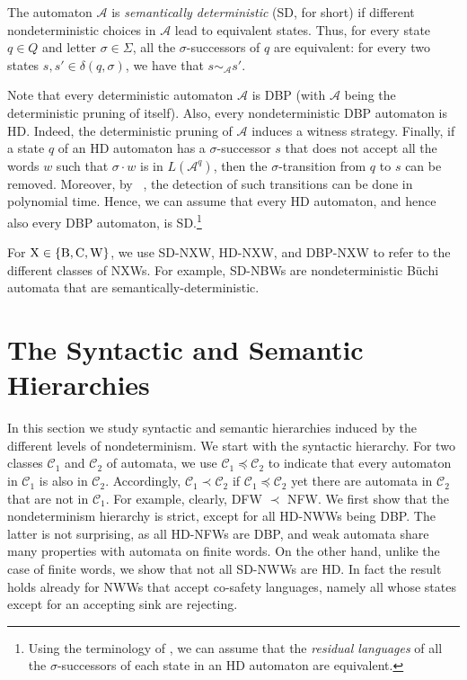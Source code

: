 \documentclass[10pt,a4paper]{amsart}
\theoremstyle{definition}
\numberwithin{equation}{section}
\newcommand{\A}{{\mathcal A}}
\newcommand{\C}{{\mathcal C}}
\begin{document}
The automaton $\A$ is \emph{semantically deterministic\/} (SD, for short) if different nondeterministic choices in $\A$ lead to equivalent states. Thus, for every state $q\in Q$ and letter $\sigma \in \Sigma$, all the $\sigma$-successors of $q$ are equivalent: for every two states $s, s'\in \delta(q,\sigma)$, we have that $s \sim_{\A} s'$.  

Note that every deterministic automaton $\A$ is DBP (with $\A$ being the deterministic pruning of itself).  Also, every nondeterministic DBP automaton is HD. Indeed, the deterministic pruning of $\A$ induces a witness strategy. Finally, if a state $q$ of an HD automaton has a $\sigma$-successor $s$ that does not accept all the words $w$ such that $\sigma \cdot w$ is in $L(\A^q)$, then the $\sigma$-transition from $q$ to $s$ can be removed. Moreover, by ~\cite{HKR02,KS15, BK18}, the detection of such transitions can be done in polynomial time. Hence, we can assume that every HD automaton, and hence also every DBP automaton, is SD.\footnote{Using the terminology of \cite{KS15}, we can assume that the {\em residual languages\/} of all the $\sigma$-successors of each state in an HD automaton are equivalent.}

For ${\rm X} \in \{{\rm B,C,W}\}$, we use SD-NXW, HD-NXW, and DBP-NXW to refer to the different classes of NXWs. For example, SD-NBWs are nondeterministic B\"uchi automata that are semantically-deterministic. 



\section{The Syntactic and Semantic Hierarchies}


In this section we study syntactic and semantic hierarchies induced by the different levels of nondeterminism. We start with the syntactic hierarchy. For two classes $\C_1$ and $\C_2$ of automata, we use $\C_1 \preceq \C_2$ to indicate that every automaton in $\C_1$ is also in $\C_2$. Accordingly, $\C_1 \prec \C_2$ if $\C_1 \preceq \C_2$ yet there are automata in $\C_2$ that are not in $\C_1$. For example, clearly, DFW $\prec$ NFW. We first show that the nondeterminism hierarchy is strict, except for all HD-NWWs being DBP. The latter is not surprising, as all HD-NFWs are DBP, and weak automata share many properties with automata on finite words. On the other hand, unlike the case of finite words, we show that not all SD-NWWs are HD. In fact the result holds already for NWWs that accept co-safety languages, namely all whose states except for an accepting sink are rejecting. 
\end{document}
